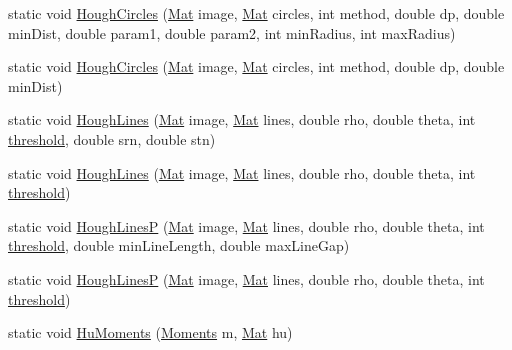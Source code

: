 \begin{DoxyCompactItemize}
static void \mbox{\hyperlink{classorg_1_1opencv_1_1imgproc_1_1_imgproc_a0338b01497ff28dc2c68f353a300cc7a}{Hough\+Circles}} (\mbox{\hyperlink{classorg_1_1opencv_1_1core_1_1_mat}{Mat}} image, \mbox{\hyperlink{classorg_1_1opencv_1_1core_1_1_mat}{Mat}} circles, int method, double dp, double min\+Dist, double param1, double param2, int min\+Radius, int max\+Radius)
\item 
static void \mbox{\hyperlink{classorg_1_1opencv_1_1imgproc_1_1_imgproc_a6fa86b567ca08ae92eab90cc998728d9}{Hough\+Circles}} (\mbox{\hyperlink{classorg_1_1opencv_1_1core_1_1_mat}{Mat}} image, \mbox{\hyperlink{classorg_1_1opencv_1_1core_1_1_mat}{Mat}} circles, int method, double dp, double min\+Dist)
\item 
static void \mbox{\hyperlink{classorg_1_1opencv_1_1imgproc_1_1_imgproc_a28db1a1f638c5882a4f1af67f081522c}{Hough\+Lines}} (\mbox{\hyperlink{classorg_1_1opencv_1_1core_1_1_mat}{Mat}} image, \mbox{\hyperlink{classorg_1_1opencv_1_1core_1_1_mat}{Mat}} lines, double rho, double theta, int \mbox{\hyperlink{classorg_1_1opencv_1_1imgproc_1_1_imgproc_a428d1896f05ae5e0eadbe9a1489e6368}{threshold}}, double srn, double stn)
\item 
static void \mbox{\hyperlink{classorg_1_1opencv_1_1imgproc_1_1_imgproc_a6b72bf2114aa1ea4e834451880a5eb8b}{Hough\+Lines}} (\mbox{\hyperlink{classorg_1_1opencv_1_1core_1_1_mat}{Mat}} image, \mbox{\hyperlink{classorg_1_1opencv_1_1core_1_1_mat}{Mat}} lines, double rho, double theta, int \mbox{\hyperlink{classorg_1_1opencv_1_1imgproc_1_1_imgproc_a428d1896f05ae5e0eadbe9a1489e6368}{threshold}})
\item 
static void \mbox{\hyperlink{classorg_1_1opencv_1_1imgproc_1_1_imgproc_abcb38549a6c9bd2ec81e601a0a76e4ba}{Hough\+LinesP}} (\mbox{\hyperlink{classorg_1_1opencv_1_1core_1_1_mat}{Mat}} image, \mbox{\hyperlink{classorg_1_1opencv_1_1core_1_1_mat}{Mat}} lines, double rho, double theta, int \mbox{\hyperlink{classorg_1_1opencv_1_1imgproc_1_1_imgproc_a428d1896f05ae5e0eadbe9a1489e6368}{threshold}}, double min\+Line\+Length, double max\+Line\+Gap)
\item 
static void \mbox{\hyperlink{classorg_1_1opencv_1_1imgproc_1_1_imgproc_af9376e12a80f1305ddc5fb8046220902}{Hough\+LinesP}} (\mbox{\hyperlink{classorg_1_1opencv_1_1core_1_1_mat}{Mat}} image, \mbox{\hyperlink{classorg_1_1opencv_1_1core_1_1_mat}{Mat}} lines, double rho, double theta, int \mbox{\hyperlink{classorg_1_1opencv_1_1imgproc_1_1_imgproc_a428d1896f05ae5e0eadbe9a1489e6368}{threshold}})
\item 
static void \mbox{\hyperlink{classorg_1_1opencv_1_1imgproc_1_1_imgproc_a98bb53e1f35c2f318b22de3b4bc753e1}{Hu\+Moments}} (\mbox{\hyperlink{classorg_1_1opencv_1_1imgproc_1_1_moments}{Moments}} m, \mbox{\hyperlink{classorg_1_1opencv_1_1core_1_1_mat}{Mat}} hu)

\end{DoxyCompactItemize}
